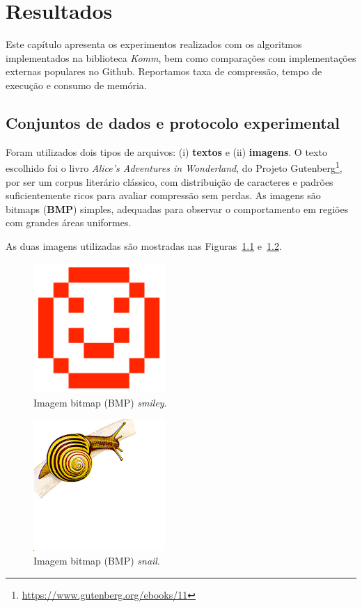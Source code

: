 \chapter{Resultados}\label{cap:Resultados}

Este capítulo apresenta os experimentos realizados com os algoritmos implementados na biblioteca \textit{Komm}, bem como comparações com implementações externas populares no Github. Reportamos taxa de compressão, tempo de execução e consumo de memória.
\section{Conjuntos de dados e protocolo experimental}

Foram utilizados dois tipos de arquivos: (i) \textbf{textos} e (ii) \textbf{imagens}. O texto escolhido foi o livro \textit{Alice’s Adventures in Wonderland}, do Projeto Gutenberg\footnote{\url{https://www.gutenberg.org/ebooks/11}}, por ser um corpus literário clássico, com distribuição de caracteres e padrões suficientemente ricos para avaliar compressão sem perdas. As imagens são bitmaps (\textbf{BMP}) simples, adequadas para observar o comportamento em regiões com grandes áreas uniformes.

As duas imagens utilizadas são mostradas nas Figuras~\ref{fig:smiley} e~\ref{fig:snail}.

\begin{figure}[h]
  \centering
  \caption{Imagem bitmap (BMP) \textit{smiley}.}
  \label{fig:smiley}
  \includegraphics[width=5cm]{figuras/smiley-large.png}
\end{figure}

\begin{figure}[h]
  \centering
  \caption{Imagem bitmap (BMP) \textit{snail}.}
  \label{fig:snail}
  \includegraphics[width=5cm]{figuras/snail.png}
\end{figure}

